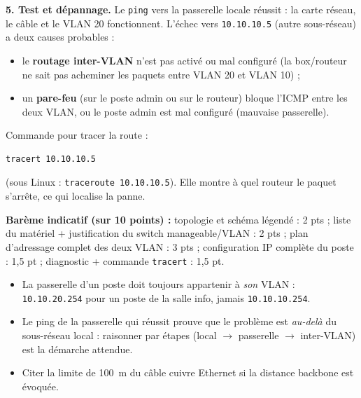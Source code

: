 \documentclass[11pt]{article}
\begin{document}
\begin{corrige}
\textbf{5. Test et dépannage.} Le \texttt{ping} vers la passerelle locale réussit : la carte réseau, le câble et le VLAN 20 fonctionnent. L'échec vers \texttt{10.10.10.5} (autre sous-réseau) a deux causes probables :
\begin{itemize}
    \item le \textbf{routage inter-VLAN} n'est pas activé ou mal configuré (la box/routeur ne sait pas acheminer les paquets entre VLAN 20 et VLAN 10) ;
    \item un \textbf{pare-feu} (sur le poste admin ou sur le routeur) bloque l'ICMP entre les deux VLAN, ou le poste admin est mal configuré (mauvaise passerelle).
\end{itemize}
Commande pour tracer la route :
\begin{lstlisting}[language=bash]
tracert 10.10.10.5
\end{lstlisting}
(sous Linux : \texttt{traceroute 10.10.10.5}). Elle montre à quel routeur le paquet s'arrête, ce qui localise la panne.

\textbf{Barème indicatif (sur 10 points) :} topologie et schéma légendé : 2 pts ; liste du matériel + justification du switch manageable/VLAN : 2 pts ; plan d'adressage complet des deux VLAN : 3 pts ; configuration IP complète du poste : 1,5 pt ; diagnostic + commande \texttt{tracert} : 1,5 pt.

\begin{attention}
\begin{itemize}
    \item La passerelle d'un poste doit toujours appartenir à \emph{son} VLAN : \texttt{10.10.20.254} pour un poste de la salle info, jamais \texttt{10.10.10.254}.
    \item Le ping de la passerelle qui réussit prouve que le problème est \emph{au-delà} du sous-réseau local : raisonner par étapes (local $\rightarrow$ passerelle $\rightarrow$ inter-VLAN) est la démarche attendue.
    \item Citer la limite de \SI{100}{m} du câble cuivre Ethernet si la distance backbone est évoquée.
\end{itemize}
\end{attention}
\end{corrige}
\end{document}
